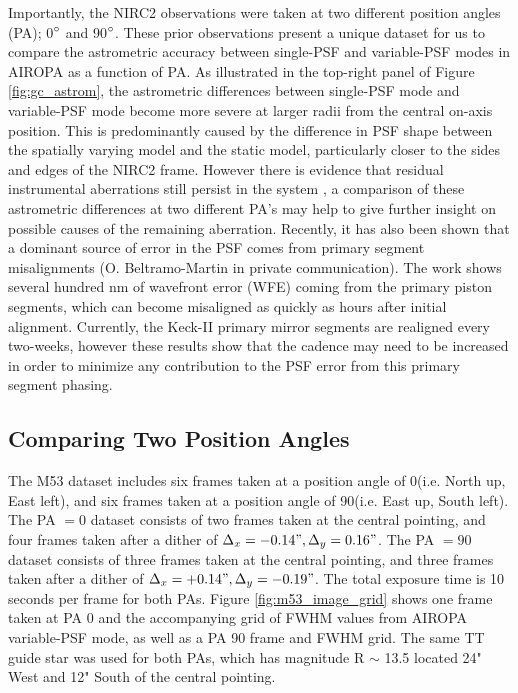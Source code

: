 \documentclass[]{spie}  %
\begin{document}
Importantly, the NIRC2 observations were taken at two different position angles (PA); 0$\degree$ and 90$\degree$. These prior observations present a unique dataset for us to compare the astrometric accuracy between single-PSF and variable-PSF modes in AIROPA as a function of PA. As illustrated in the top-right panel of Figure \ref{fig:gc_astrom}, the astrometric differences between single-PSF mode and variable-PSF mode become more severe at larger radii from the central on-axis position. This is predominantly caused by the difference in PSF shape between the spatially varying model and the static model, particularly closer to the sides and edges of the NIRC2 frame. However there is evidence that residual instrumental aberrations still persist in the system \citep{Turri:inprep}, a comparison of these astrometric differences at two different PA's may help to give further insight on possible causes of the remaining aberration. Recently, it has also been shown that a dominant source of error in the PSF comes from primary segment misalignments (O. Beltramo-Martin in private communication). The work shows several hundred nm of wavefront error (WFE) coming from the primary piston segments, which can become misaligned as quickly as hours after initial alignment. Currently, the Keck-II primary mirror segments are realigned every two-weeks, however these results show that the cadence may need to be increased in order to minimize any contribution to the PSF error from this primary segment phasing.

\subsection{Comparing Two Position Angles}
The M53 dataset includes six frames taken at a position angle of 0\degree (i.e. North up, East left), and six frames taken at a position angle of 90\degree (i.e. East up, South left). The PA $=0$ dataset consists of two frames taken at the central pointing, and four frames taken after a dither of $\Delta_x = -0.14", \Delta_y = 0.16"$. The PA $=90$ dataset consists of three frames taken at the central pointing, and three frames taken after a dither of $\Delta_x = +0.14", \Delta_y = -0.19"$. The total exposure time is 10 seconds per frame for both PAs. Figure \ref{fig:m53_image_grid} shows one frame taken at PA 0 and the accompanying grid of FWHM values from AIROPA variable-PSF mode, as well as a PA 90 frame and FWHM grid. The same TT guide star was used for both PAs, which has magnitude R ${\sim}$ 13.5 located 24" West and 12" South of the central pointing.
\end{document}
